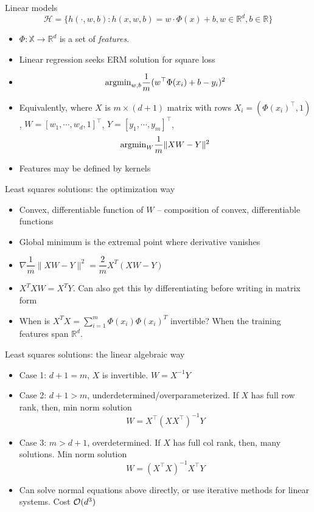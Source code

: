 \documentclass[final]{beamer}
\begin{document}
\begin{frame}{Linear models}
	\begin{equation}
		\mathcal{H} = \{h(\cdot, w, b): h(x, w, b) = w\cdot \Phi(x) + b, w \in \mathbb{R}^d, b \in \mathbb{R} \}
	\end{equation}
\pause
\begin{itemize}
	\item $\Phi: \mathbb{X} \to \mathbb{R}^d$ is a set of \emph{features}.
	\pause
	\item Linear regression seeks ERM solution for square loss
	\pause
	\item $${\rm arg min}_{w, b} \dfrac{1}{m} (w^\top \Phi(x_i) + b - y_i)^2$$
	\pause 
\item Equivalently, where $X$ is $m\times (d+1)$ matrix with rows $X_i = (\Phi(x_i)^\top, 1)$, $W = [w_1, \cdots, w_d, 1]^\top$, $Y = [y_1, \cdots, y_m]^\top$,
	\pause
	$$ {\rm arg min}_{W} \dfrac{1}{m} \|X W - Y\|^2$$
\item Features may be defined by kernels
\end{itemize}
\end{frame}
\begin{frame}{Least squares solutions: the optimization way}
	\begin{itemize}
		\item Convex, differentiable function of $W$ -- composition of convex, differentiable functions
		\pause
		\item Global minimum is the extremal point where derivative vanishes
		\pause
		\item $\nabla \dfrac{1}{m}\|X W - Y\|^2 = \dfrac{2}{m} X^T(XW - Y)$
		\pause
		\item $X^T X W = X^T Y$. Can also get this by differentiating before writing in matrix form
		\pause
		\item When is $X^T X = \sum_{i=1}^m \Phi(x_i) \Phi(x_i)^T$ invertible? When the training features span $\mathbb{R}^d$.  
	\end{itemize}
\end{frame}
\begin{frame}{Least squares solutions: the linear algebraic way}
	\begin{itemize}
		\item Case 1: $d+1 = m$, $X$ is invertible. $W = X^{-1} Y$
		\pause 
	\item Case 2: $d+1 > m$, underdetermined/overparameterized. If $X$ has full row rank, then, min norm solution	$$ W = X^\top (X X^\top)^{-1} Y$$
\pause
	\item Case 3: $m > d+1$, overdetermined. If $X$ has full col rank, then, many solutions. Min norm solution $$ W = (X^\top X)^{-1} X^\top Y$$
	\pause
\item Can solve normal equations above directly, or use iterative methods for linear systems. Cost ${\cal O}(d^3)$ 
\end{itemize}
\end{frame}
\end{document}
